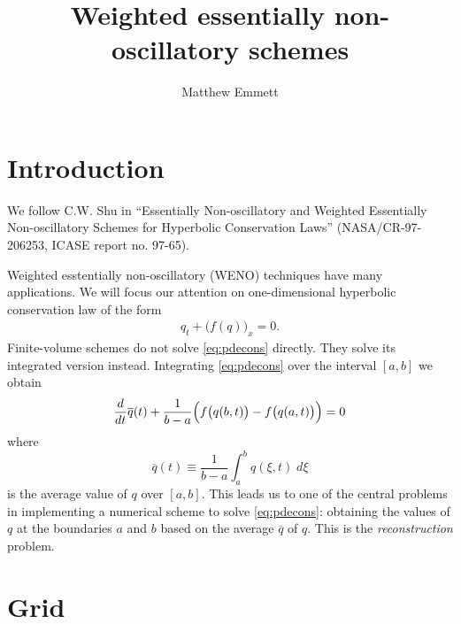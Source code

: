 \documentclass{article}
\newcommand{\dd}[2]{\frac{d #1}{d #2}}
\numberwithin{equation}{section}
\begin{document}
\title{Weighted essentially non-oscillatory schemes}
\author{Matthew Emmett}
\maketitle


\section{Introduction}

We follow C.W. Shu in ``Essentially Non-oscillatory and Weighted
Essentially Non-oscillatory Schemes for Hyperbolic Conservation Laws''
(NASA/CR-97-206253, ICASE report no. 97-65).

Weighted esstentially non-oscillatory (WENO) techniques have many
applications.  We will focus our attention on one-dimensional
hyperbolic conservation law of the form
\begin{gather}
  \label{eq:pdecons}
  q_t + \bigl( f(q) \bigr)_x = 0.
\end{gather}
Finite-volume schemes do not solve \eqref{eq:pdecons} directly.  They
solve its integrated version instead.  Integrating \eqref{eq:pdecons}
over the interval $[a,b]$ we obtain
\begin{equation*}
  \dd{}{t} \overline{q}(t)
    + \frac{1}{b - a} \Bigl( f\bigl(q(b,t)\bigr)
                                - f\bigl(q(a,t)\bigr) \Bigr) = 0
\end{equation*}
where
\begin{equation*}
  \overline{q}(t)
    \equiv \frac{1}{b - a} \int_{a}^{b} q(\xi,t) \;d\xi
\end{equation*}
is the average value of $q$ over $[a,b]$.  This leads us to one of
the central problems in implementing a numerical scheme to solve
\eqref{eq:pdecons}: obtaining the values of $q$ at the boundaries $a$
and $b$ based on the average $\overline{q}$ of $q$.  This is the
\emph{reconstruction} problem.

\newpage
\section{Grid}
\end{document}
